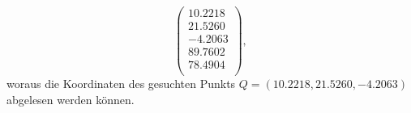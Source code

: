 \begin{loesung}
\[\begin{pmatrix}
   10.2218\\
   21.5260\\
   -4.2063\\
   89.7602\\
   78.4904\\
\end{pmatrix},
\]
woraus die Koordinaten des gesuchten Punkts 
$Q=(10.2218,21.5260,-4.2063)$ abgelesen werden können.
\end{loesung}

